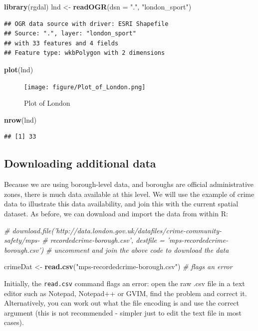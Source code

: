 \documentclass[]{article}
\newenvironment{Shaded}{}{}
\newcommand{\KeywordTok}[1]{\textcolor[rgb]{0.00,0.44,0.13}{\textbf{{#1}}}}
\newcommand{\DataTypeTok}[1]{\textcolor[rgb]{0.56,0.13,0.00}{{#1}}}
\newcommand{\StringTok}[1]{\textcolor[rgb]{0.25,0.44,0.63}{{#1}}}
\newcommand{\CommentTok}[1]{\textcolor[rgb]{0.38,0.63,0.69}{\textit{{#1}}}}
\newcommand{\NormalTok}[1]{{#1}}
\begin{document}
\begin{Shaded}
\begin{Highlighting}[]
\KeywordTok{library}\NormalTok{(rgdal)}
\NormalTok{lnd <- }\KeywordTok{readOGR}\NormalTok{(}\DataTypeTok{dsn =} \StringTok{"."}\NormalTok{, }\StringTok{"london_sport"}\NormalTok{)}
\end{Highlighting}
\end{Shaded}
\begin{verbatim}
## OGR data source with driver: ESRI Shapefile 
## Source: ".", layer: "london_sport"
## with 33 features and 4 fields
## Feature type: wkbPolygon with 2 dimensions
\end{verbatim}
\begin{Shaded}
\begin{Highlighting}[]
\KeywordTok{plot}\NormalTok{(lnd)}
\end{Highlighting}
\end{Shaded}
\begin{figure}[htbp]
\centering
\texttt{[image: figure/Plot\_of\_London.png]}
\caption{Plot of London}
\end{figure}

\begin{Shaded}
\begin{Highlighting}[]
\KeywordTok{nrow}\NormalTok{(lnd)}
\end{Highlighting}
\end{Shaded}
\begin{verbatim}
## [1] 33
\end{verbatim}
\subsection{Downloading additional data}

Because we are using borough-level data, and boroughs are official
administrative zones, there is much data available at this level. We
will use the example of crime data to illustrate this data availability,
and join this with the current spatial dataset. As before, we can
download and import the data from within R:

\begin{Shaded}
\begin{Highlighting}[]
\CommentTok{# download.file('http://data.london.gov.uk/datafiles/crime-community-safety/mps-}
\CommentTok{# recordedcrime-borough.csv', destfile = 'mps-recordedcrime-borough.csv')}
\CommentTok{# uncomment and join the above code to download the data}

\NormalTok{crimeDat <- }\KeywordTok{read.csv}\NormalTok{(}\StringTok{"mps-recordedcrime-borough.csv"}\NormalTok{)  }\CommentTok{# flags an error}
\end{Highlighting}
\end{Shaded}
Initially, the \texttt{read.csv} command flags an error: open the raw
.csv file in a text editor such as Notepad, Notepad++ or GVIM, find the
problem and correct it. Alternatively, you can work out what the file
encoding is and use the correct argument (this is not recommended -
simpler just to edit the text file in most cases).
\end{document}
